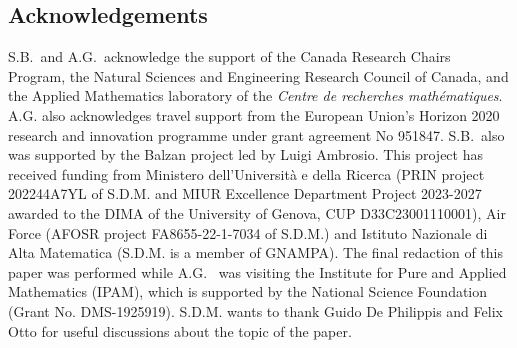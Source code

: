 \documentclass[reqno,12pt]{article}
\begin{document}
\subsection*{Acknowledgements}
%
S.B.\ and A.G.\ acknowledge the support of the Canada Research Chairs Program, the Natural Sciences and Engineering Research Council of Canada, and the Applied Mathematics laboratory of the \textit{Centre de recherches math\'ematiques}. A.G. also acknowledges travel support from the European Union's Horizon 2020 research and innovation programme under grant
agreement No 951847. S.B.\ also was supported by the Balzan project led by Luigi Ambrosio.  This project has received funding from Ministero dell'Universit\`a e della Ricerca (PRIN project 202244A7YL of S.D.M. and MIUR Excellence Department Project 2023-2027 awarded to the DIMA of the University of Genova, CUP D33C23001110001), Air Force (AFOSR project FA8655-22-1-7034 of S.D.M.) and Istituto Nazionale di Alta Matematica (S.D.M. is a member of GNAMPA). The final redaction of this paper was performed while A.G. \ was visiting the Institute for Pure and Applied Mathematics (IPAM), which is supported by the National Science Foundation (Grant No. DMS-1925919). S.D.M. wants to thank Guido De Philippis and Felix Otto for useful discussions about the topic of the paper.



\end{document}
